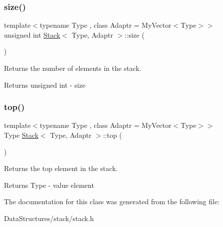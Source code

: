 \subsubsection{\texorpdfstring{size()}{size()}}
{\footnotesize\ttfamily template$<$typename Type , class Adaptr  = My\+Vector$<$\+Type$>$$>$ \\
unsigned int \hyperlink{classStack}{Stack}$<$ Type, Adaptr $>$\+::size (\begin{DoxyParamCaption}{ }\end{DoxyParamCaption})}



Returns the number of elements in the stack. 

\begin{DoxyReturn}{Returns}
unsigned int -\/ size 
\end{DoxyReturn}
\mbox{\label{classStack_a4ec6a7947857564e39ed4bd62392fb3a}} 
\subsubsection{\texorpdfstring{top()}{top()}}
{\footnotesize\ttfamily template$<$typename Type , class Adaptr  = My\+Vector$<$\+Type$>$$>$ \\
Type \hyperlink{classStack}{Stack}$<$ Type, Adaptr $>$\+::top (\begin{DoxyParamCaption}{ }\end{DoxyParamCaption})}



Returns the top element in the stack. 

\begin{DoxyReturn}{Returns}
Type -\/ value element 
\end{DoxyReturn}


The documentation for this class was generated from the following file\+:\begin{DoxyCompactItemize}
\item 
Data\+Structures/stack/stack.\+h\end{DoxyCompactItemize}
